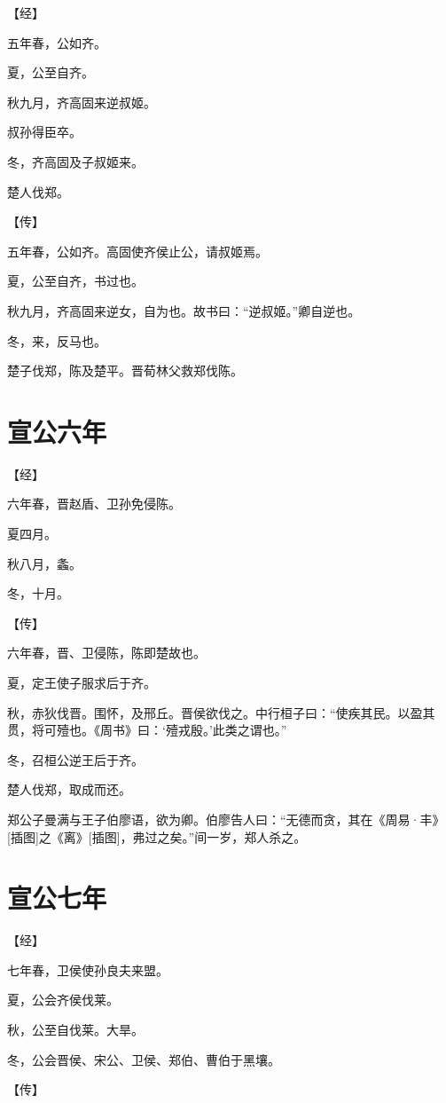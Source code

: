 \documentclass[a4paper,12pt,UTF8,twoside]{ctexbook}
\begin{document}
【经】

五年春，公如齐。

夏，公至自齐。

秋九月，齐高固来逆叔姬。

叔孙得臣卒。

冬，齐高固及子叔姬来。

楚人伐郑。

【传】

五年春，公如齐。高固使齐侯止公，请叔姬焉。

夏，公至自齐，书过也。

秋九月，齐高固来逆女，自为也。故书曰：“逆叔姬。”卿自逆也。

冬，来，反马也。

楚子伐郑，陈及楚平。晋荀林父救郑伐陈。


\chapter{宣公六年}




【经】

六年春，晋赵盾、卫孙免侵陈。

夏四月。

秋八月，螽。

冬，十月。

【传】

六年春，晋、卫侵陈，陈即楚故也。

夏，定王使子服求后于齐。

秋，赤狄伐晋。围怀，及邢丘。晋侯欲伐之。中行桓子曰：“使疾其民。以盈其贯，将可殪也。《周书》曰：‘殪戎殷。’此类之谓也。”

冬，召桓公逆王后于齐。

楚人伐郑，取成而还。

郑公子曼满与王子伯廖语，欲为卿。伯廖告人曰：“无德而贪，其在《周易·丰》[插图]之《离》[插图]，弗过之矣。”间一岁，郑人杀之。

\chapter{宣公七年}



【经】

七年春，卫侯使孙良夫来盟。

夏，公会齐侯伐莱。

秋，公至自伐莱。大旱。

冬，公会晋侯、宋公、卫侯、郑伯、曹伯于黑壤。

【传】
\end{document}
